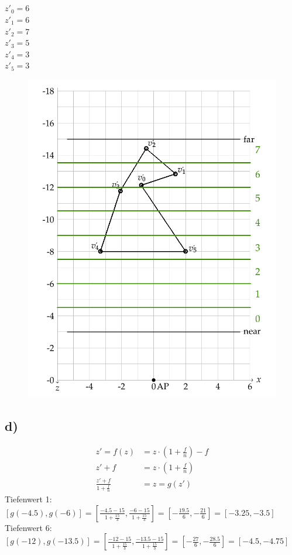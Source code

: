 \documentclass[a4paper,10pt,DIV=14]{article}
\begin{document}
\subsection{} %
$z'_0 = 6$\\
$z'_1 = 6$\\
$z'_2 = 7$\\
$z'_3 = 5$\\
$z'_4 = 3$\\
$z'_5 = 3$
\begin{figure}[!htbp]
	\centering
	\includegraphics[width=1\linewidth]{2c}
\end{figure}
\subsection{d)}
\begin{align*}
    z' = f(z) &= z \cdot \left( 1 + \frac{f}{n} \right) -f\\
    z' + f &= z \cdot \left( 1 + \frac{f}{n} \right)\\
    \frac{z' + f}{1 + \frac{f}{n}} &= z = g(z')
\end{align*}
Tiefenwert 1:\\
$\left[ g(-4.5), g(-6) \right] = \left[ \frac{-4.5 - 15}{1 + \frac{15}{3}} , \frac{-6 - 15}{1 + \frac{15}{3}} \right] = \left[ -\frac{19.5}{6} , -\frac{21}{6} \right] = \left[ -3.25 , -3.5 \right]$\\
Tiefenwert 6:\\
$\left[ g(-12), g(-13.5) \right] = \left[ \frac{-12 - 15}{1 + \frac{15}{3}} , \frac{-13.5 - 15}{1 + \frac{15}{3}} \right] = \left[ -\frac{27}{6} , -\frac{28.5}{6} \right] = \left[ -4.5 , -4.75 \right]$
\end{document}
